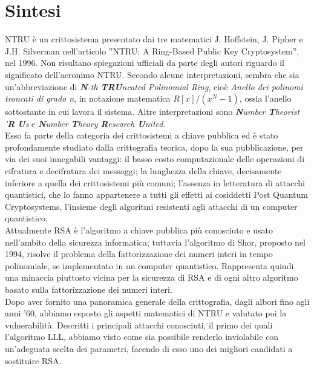 \documentclass[a4paper,12pt]{report}
\theoremstyle{plain}
\theoremstyle{definition}
\theoremstyle{remark}
\begin{document}
\chapter*{Sintesi}%
NTRU \`e un crittosistema presentato dai tre matematici J. Hoffstein, J. Pipher e J.H. Silverman nell'articolo ''NTRU: A Ring-Based Public Key Cryptosystem'', nel 1996. Non risultano spiegazioni ufficiali da parte degli autori riguardo il significato dell'acronimo NTRU. Secondo alcune interpretazioni, sembra che sia un'abbreviazione di \textit{\textbf{N}-th \textbf{TRU}ncated Polinomial Ring}, cio\` e \textit{Anello dei polinomi troncati di grado n}, in notazione matematica $R[x]/(x^N-1)$, ossia l'anello sottostante in cui lavora il sistema. Altre interpretazioni sono \textit{\textbf{N}umber \textbf{T}heorist '\textbf{R} \textbf{U}s} e \textit{\textbf{N}umber \textbf{T}heory  \textbf{R}esearch \textbf{U}nited}.\\
Esso fa parte della categoria dei crittosistemi a chiave pubblica ed \` e stato profondamente studiato dalla crittografia teorica, dopo la sua pubblicazione, per via dei suoi innegabili vantaggi: il basso costo computazionale delle operazioni di cifratura e decifratura dei messaggi; la lunghezza della chiave, decisamente inferiore a quella dei crittosistemi pi\` u comuni; l'assenza in letteratura di attacchi quantistici, che lo fanno appartenere a tutti gli effetti ai cosiddetti Post Quantum Cryptosystems, l'insieme degli algoritmi resistenti agli attacchi di un computer quantistico.\\
Attualmente RSA \` e l'algoritmo a chiave pubblica pi\` u conosciuto e usato nell'ambito della sicurezza informatica; tuttavia l'algoritmo di Shor, proposto nel 1994, risolve il problema della fattorizzazione dei numeri interi in tempo polinomiale, se implementato in un computer quantistico. Rappresenta quindi una minaccia piuttosto vicina per la sicurezza di RSA e di ogni altro algoritmo basato sulla fattorizzazione dei numeri interi. 
\\
Dopo aver fornito una panoramica generale della crittografia, dagli albori fino agli anni '60, abbiamo esposto gli aspetti matematici di NTRU e valutato poi la vulnerabilit\` a. Descritti i principali attacchi conosciuti, il primo dei quali l'algoritmo LLL, abbiamo visto come sia possibile renderlo inviolabile con un'adeguata scelta dei parametri, facendo di esso uno dei migliori candidati a sostituire RSA.
\\ \\ \\
\end{document}
